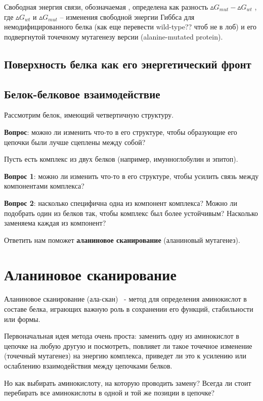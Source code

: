 Свободная энергия связи, обозначаемая \ddG, определена как разность $\vartriangle\!G_{mut} - \vartriangle\!G_{wt}$ , где $\vartriangle\!G_{wt}$ и $\vartriangle\!G_{mut}$ -- изменения свободной энергии Гиббса для немодифицированного белка (как еще перевести wild-type?? чтоб не в лоб) и его подвергнутой точечному мутагенезу версии (alanine-mutated
protein).
\newpage
\subsection{Поверхность белка как его энергетический фронт}
\subsection{Белок-белковое взаимодействие}
Рассмотрим белок, имеющий четвертичную структуру.

\textbf{Вопрос}: можно ли изменить что-то в его структуре, чтобы образующие его цепочки были лучше сцеплены между собой?

Пусть есть комплекс из двух белков (например, имунноглобулин и эпитоп).

\textbf{Вопрос 1}: можно ли изменить что-то в его структуре, чтобы усилить связь между компонентами комплекса?

\textbf{Вопрос 2}: насколько специфична одна из компонент комплекса?  Можно ли подобрать один из белков так, чтобы комплекс был более устойчивым? Насколько заменяема каждая из компонент?

Ответить нам поможет \textbf{аланиновое сканирование} (аланиновый мутагенез).
\newpage
\section{Аланиновое сканирование}
Аланиновое сканирование (ала-скан)~\cite{alascan2001} - метод для определения аминокислот в составе белка, играющих важную роль в сохранении его функций, стабильности или формы.

Первоначальная идея метода очень проста: заменить одну из аминокислот в цепочке на любую другую и посмотреть, повлияет ли такое точечное изменение (точечный мутагенез) на энергию комплекса, приведет ли это к усилению или ослаблению взаимодействия между цепочками белков. 
\begin{center}
\resizebox{0.4\textheight}{!}{
\ttfamily
\footnotesize
\aapicture
}
\end{center}

Но как выбирать аминокислоту, на которую проводить замену? Всегда ли стоит перебирать все аминокислоты в одной и той же позиции в цепочке?

